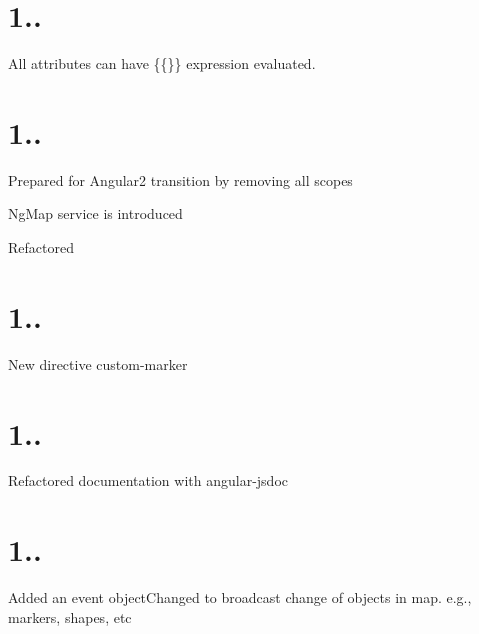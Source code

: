 \section*{1..}


\begin{DoxyItemize}
\item All attributes can have {\ttfamily \{\{\}\}} expression evaluated.
\end{DoxyItemize}

\section*{1..}


\begin{DoxyItemize}
\item Prepared for Angular2 transition by removing all scopes
\item Ng\+Map service is introduced
\item Refactored
\end{DoxyItemize}

\section*{1..}


\begin{DoxyItemize}
\item New directive {\ttfamily custom-\/marker}
\end{DoxyItemize}

\section*{1..}


\begin{DoxyItemize}
\item Refactored documentation with angular-\/jsdoc
\end{DoxyItemize}

\section*{1..}


\begin{DoxyItemize}
\item Added an event {\ttfamily object\+Changed} to broadcast change of objects in map. e.\+g., markers, shapes, etc
\end{DoxyItemize}

